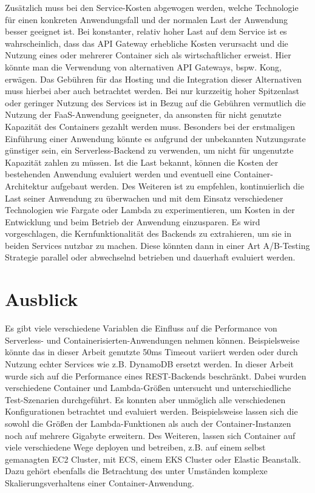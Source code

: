 Zusätzlich muss bei den Service-Kosten abgewogen werden, welche Technologie für einen konkreten Anwendungsfall und der normalen Last der Anwendung besser geeignet ist. Bei konstanter, relativ hoher Last auf dem Service ist es wahrscheinlich, dass das API Gateway erhebliche Kosten verursacht und die Nutzung eines oder mehrerer Container sich als wirtschaftlicher erweist. Hier könnte man die Verwendung von alternativen API Gateways, bspw. Kong\cite{noauthor_kongkong_2021}, erwägen. Das Gebühren für das Hosting und die Integration dieser Alternativen muss hierbei aber auch betrachtet werden. Bei nur kurzzeitig hoher Spitzenlast oder geringer Nutzung des Services ist in Bezug auf die Gebühren vermutlich die Nutzung der FaaS-Anwendung geeigneter, da ansonsten für nicht genutzte Kapazität des Containers gezahlt werden muss. 
Besonders bei der erstmaligen Einführung einer Anwendung könnte es aufgrund der unbekannten Nutzungsrate günstiger sein, ein Serverless-Backend zu verwenden, um nicht für ungenutzte Kapazität zahlen zu müssen. Ist die Last bekannt, können die Kosten der bestehenden Anwendung evaluiert werden und eventuell eine Container-Architektur aufgebaut werden.
Des Weiteren ist zu empfehlen, kontinuierlich die Last seiner Anwendung zu überwachen und mit dem Einsatz verschiedener Technologien wie Fargate oder Lambda zu experimentieren, um Kosten in der Entwicklung und beim Betrieb der Anwendung einzusparen. Es wird vorgeschlagen, die Kernfunktionalität des Backends zu extrahieren, um sie in beiden Services nutzbar zu machen. Diese könnten dann in einer Art A/B-Testing Strategie parallel oder abwechselnd betrieben und dauerhaft evaluiert werden.

\section{Ausblick}
Es gibt viele verschiedene Variablen die Einfluss auf die Performance von Serverless- und Containerisierten-Anwendungen nehmen können. Beispielsweise könnte das in dieser Arbeit genutzte 50ms Timeout variiert werden oder durch Nutzung echter Services wie z.B. DynamoDB ersetzt werden. In dieser Arbeit wurde sich auf die Performance eines REST-Backends beschränkt. Dabei wurden verschiedene Container und Lambda-Größen untersucht und unterschiedliche Test-Szenarien durchgeführt. Es konnten aber unmöglich alle verschiedenen Konfigurationen betrachtet und evaluiert werden. Beispielsweise lassen sich die sowohl die Größen der Lambda-Funktionen als auch der Container-Instanzen noch auf mehrere Gigabyte erweitern. Des Weiteren, lassen sich Container auf viele verschiedene Wege deployen und betreiben, z.B. auf einem selbst gemanagten EC2 Cluster, mit ECS, einem EKS Cluster oder Elastic Beanstalk. Dazu gehört ebenfalls die Betrachtung des unter Umständen komplexe Skalierungsverhaltens einer Container-Anwendung.

